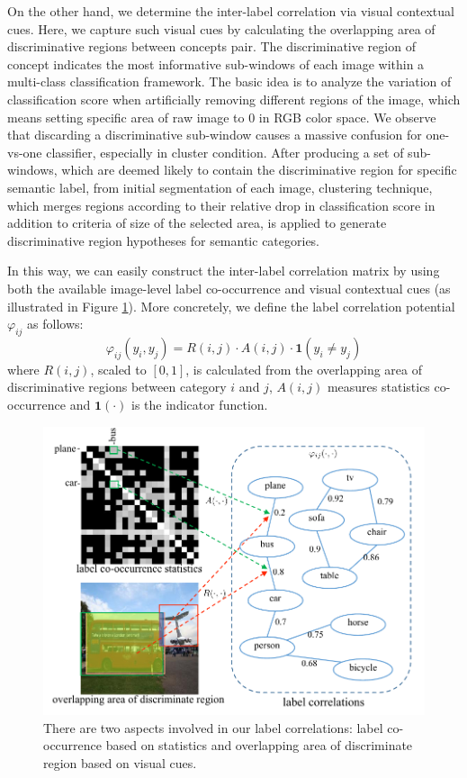On the other hand, we determine the inter-label correlation via visual contextual cues. Here, we capture such visual cues by calculating the overlapping area of discriminative regions between concepts pair.
The discriminative region of concept indicates the most informative sub-windows of each image within a multi-class classification framework.
The basic idea is to analyze the variation of classification score when artificially removing different regions of the image, which means setting specific area of raw image to 0 in RGB color space.
We observe that discarding a discriminative sub-window causes a massive confusion for one-vs-one classifier, especially in cluster condition.
After producing a set of sub-windows, which are deemed likely to contain the discriminative region for specific semantic label, from initial segmentation of each image, clustering technique, which merges regions according to their relative drop in classification score in addition to criteria of size of the selected area, is applied to generate discriminative region hypotheses for semantic categories.

In this way, we can easily construct the inter-label correlation matrix by using both the available image-level label co-occurrence and visual contextual cues (as illustrated in Figure \ref{fig:correlations}).
More concretely, we define the label correlation potential $\varphi_{ij}$ as follows:
\begin{equation}
    \varphi_{ij}(y_i,y_j) = R(i,j) \cdot A(i,j) \cdot \mathbf{1}(y_i \neq y_j)
\end{equation}
where $R(i,j)$, scaled to $[0,1]$, is calculated from the overlapping area of discriminative regions between category $i$ and $j$, $A(i,j)$ measures statistics co-occurrence and $\mathbf{1}(\cdot)$ is the indicator function.

\begin{figure}[t]
    \begin{center}
        \includegraphics[width=1\linewidth]{fig_correlations.pdf}
    \end{center}
    \caption{There are two aspects involved in our label correlations: label co-occurrence based on statistics and overlapping area of discriminate region based on visual cues.}
    \label{fig:correlations}
\end{figure}

